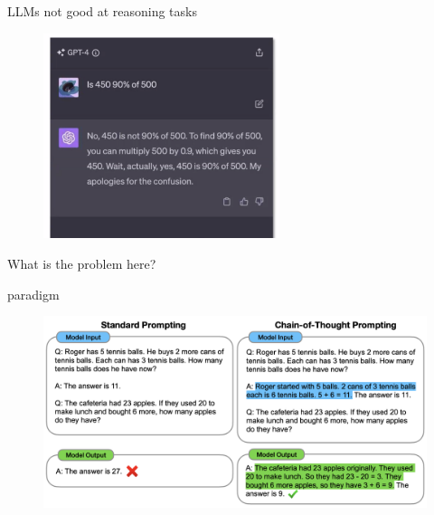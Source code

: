 \begin{frame}{LLMs not good at reasoning tasks}

\vfill
	
	\begin{figure}
		\centering
		\includegraphics[height = 6cm]{figure/is450,90,of,500} 
	\end{figure}

\ques What is the problem here?

\vfill

\end{frame}



\begin{vbframe}{\cotpfull paradigm}

\vfill


\begin{figure}
    \centering
    \includegraphics{figure/chain_of_thought.png}\\
\end{figure}

\vfill

\end{vbframe}

